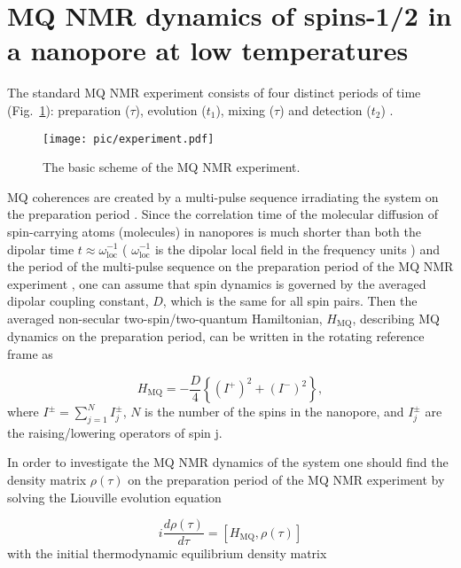 \section{MQ NMR dynamics of spins-1/2 in a nanopore at low temperatures}
\label{sec:mq_dyn}

The standard MQ NMR experiment consists of four distinct periods of time (Fig.~\ref{fig:experiment}): preparation ($\tau$), evolution ($t_1$), mixing ($\tau$) and detection ($t_2$) \cite{mq_nmr_experiment}.
\begin{figure}
    \centering
    \texttt{[image: pic/experiment.pdf]}
    \caption{The basic scheme of the MQ NMR experiment.}
    \label{fig:experiment}
\end{figure}
MQ coherences are created by a multi-pulse sequence irradiating the system on the preparation period \cite{mq_nmr_experiment}. Since the correlation time of the molecular diffusion of spin-carrying atoms (molecules) in nanopores is much shorter than both the dipolar time $t \approx \omega^{-1}_{\mathrm{loc}}$ ( $\omega^{-1}_{\mathrm{loc}}$  is the dipolar local field in the frequency units \cite{Goldman}) and  the period of the multi-pulse sequence on the preparation period of the MQ NMR experiment \cite{mq_nmr_experiment}, one can assume that spin dynamics is governed by the averaged dipolar coupling constant, $D$, which is the same for all spin pairs. Then the averaged non-secular two-spin/two-quantum Hamiltonian, $H_\mathrm{MQ}$, describing MQ dynamics on the preparation period, can be written in the rotating reference frame \cite{Goldman} as \cite{lab:mq_nmr_dyn_in_nanopores_2009}

\begin{equation}
    \label{eq:ham_mq}
    H_\mathrm{MQ}  = - \frac D 4 \left\{(I^+)^2 + (I^-)^2\right\},
\end{equation}
where  $I^{\pm} = \sum\limits_{j=1}^N I^{\pm}_j$, $N$ is the number of the spins in the nanopore, and $I^{\pm}_j$ are the raising/lowering operators of spin j.

In order to investigate the MQ NMR dynamics of the system one should find the density matrix $\rho(\tau)$ on the preparation period of the MQ NMR experiment \cite{mq_nmr_experiment} by solving the Liouville evolution equation \cite{lab:mq_mnr_qinfo_2012}

\begin{equation}
    \label{eq:liouvile}
    i \dfrac{d\rho(\tau)}{d \tau} = 
    \left[H_\mathrm{MQ}, \rho(\tau)\right]
\end{equation}
with the initial thermodynamic equilibrium density matrix

